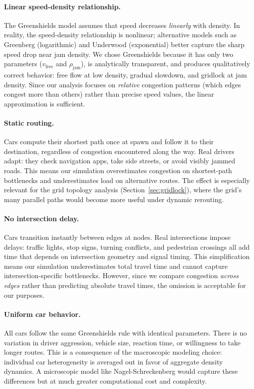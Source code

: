 \documentclass[12pt]{article}
\begin{document}
\paragraph{Linear speed-density relationship.}
The Greenshields model assumes that speed decreases \textit{linearly} with density. In reality, the speed-density relationship is nonlinear; alternative models such as Greenberg (logarithmic) and Underwood (exponential) better capture the sharp speed drop near jam density. We chose Greenshields because it has only two parameters ($v_{\text{free}}$ and $\rho_{\text{jam}}$), is analytically transparent, and produces qualitatively correct behavior: free flow at low density, gradual slowdown, and gridlock at jam density. Since our analysis focuses on \textit{relative} congestion patterns (which edges congest more than others) rather than precise speed values, the linear approximation is sufficient.

\paragraph{Static routing.}
Cars compute their shortest path once at spawn and follow it to their destination, regardless of congestion encountered along the way. Real drivers adapt: they check navigation apps, take side streets, or avoid visibly jammed roads. This means our simulation overestimates congestion on shortest-path bottlenecks and underestimates load on alternative routes. The effect is especially relevant for the grid topology analysis (Section~\ref{sec:gridlock}), where the grid's many parallel paths would become more useful under dynamic rerouting.

\paragraph{No intersection delay.}
Cars transition instantly between edges at nodes. Real intersections impose delays: traffic lights, stop signs, turning conflicts, and pedestrian crossings all add time that depends on intersection geometry and signal timing. This simplification means our simulation underestimates total travel time and cannot capture intersection-specific bottlenecks. However, since we compare congestion \textit{across edges} rather than predicting absolute travel times, the omission is acceptable for our purposes.

\paragraph{Uniform car behavior.}
All cars follow the same Greenshields rule with identical parameters. There is no variation in driver aggression, vehicle size, reaction time, or willingness to take longer routes. This is a consequence of the macroscopic modeling choice: individual car heterogeneity is averaged out in favor of aggregate density dynamics. A microscopic model like Nagel-Schreckenberg would capture these differences but at much greater computational cost and complexity.
\end{document}
